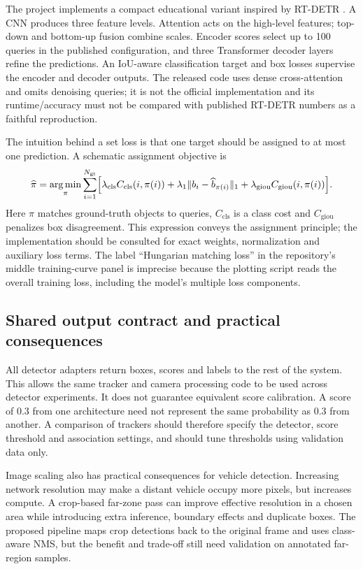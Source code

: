 The project implements a compact educational variant inspired by RT-DETR \cite{rtdetr,rtdetrcode}. A CNN produces three feature levels. Attention acts on the high-level features; top-down and bottom-up fusion combine scales. Encoder scores select up to 100 queries in the published configuration, and three Transformer decoder layers refine the predictions. An IoU-aware classification target and box losses supervise the encoder and decoder outputs. The released code uses dense cross-attention and omits denoising queries; it is not the official implementation and its runtime/accuracy must not be compared with published RT-DETR numbers as a faithful reproduction.

The intuition behind a set loss is that one target should be assigned to at most one prediction. A schematic assignment objective is
\begin{equation}
\widehat{\pi}=\underset{\pi}{\arg\min}\sum_{i=1}^{N_{\mathrm{gt}}}
\Bigl[\lambda_{\mathrm{cls}}C_{\mathrm{cls}}(i,\pi(i))+
\lambda_{1}\lVert b_i-\widehat b_{\pi(i)}\rVert_1+
\lambda_{\mathrm{giou}}C_{\mathrm{giou}}(i,\pi(i))\Bigr].
\end{equation}
Here $\pi$ matches ground-truth objects to queries, $C_{\mathrm{cls}}$ is a class cost and $C_{\mathrm{giou}}$ penalizes box disagreement. This expression conveys the assignment principle; the implementation should be consulted for exact weights, normalization and auxiliary loss terms. The label ``Hungarian matching loss'' in the repository's middle training-curve panel is imprecise because the plotting script reads the overall training loss, including the model's multiple loss components.

\subsection{Shared output contract and practical consequences}
All detector adapters return boxes, scores and labels to the rest of the system. This allows the same tracker and camera processing code to be used across detector experiments. It does not guarantee equivalent score calibration. A score of 0.3 from one architecture need not represent the same probability as 0.3 from another. A comparison of trackers should therefore specify the detector, score threshold and association settings, and should tune thresholds using validation data only.

Image scaling also has practical consequences for vehicle detection. Increasing network resolution may make a distant vehicle occupy more pixels, but increases compute. A crop-based far-zone pass can improve effective resolution in a chosen area while introducing extra inference, boundary effects and duplicate boxes. The proposed pipeline maps crop detections back to the original frame and uses class-aware NMS, but the benefit and trade-off still need validation on annotated far-region samples.
